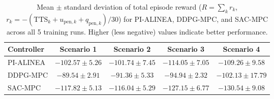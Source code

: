 \begin{table}[htbp]
\centering
\caption{Mean $\pm$ standard deviation of total episode reward ($R = \sum_k r_k$, $r_k = -(\mathrm{TTS}_k + u_{\mathrm{pen},k} + q_{\mathrm{pen},k})/30$) for PI-ALINEA, DDPG-MPC, and SAC-MPC across all 5 training runs. Higher (less negative) values indicate better performance.}
\label{tab:reward_multi}
\begin{tabular}{lcccc}
\toprule
Controller & Scenario 1 & Scenario 2 & Scenario 3 & Scenario 4 \\
\midrule
PI-ALINEA & $-102.57 \pm 5.26$ & $-101.74 \pm 7.45$ & $-114.05 \pm 7.05$ & $-109.26 \pm 9.58$ \\
DDPG-MPC & $-89.54 \pm 2.91$ & $-91.36 \pm 5.33$ & $-94.94 \pm 2.32$ & $-102.13 \pm 17.79$ \\
SAC-MPC & $-117.82 \pm 5.13$ & $-116.04 \pm 5.29$ & $-127.15 \pm 6.77$ & $-130.54 \pm 9.08$ \\
\bottomrule
\end{tabular}
\end{table}
